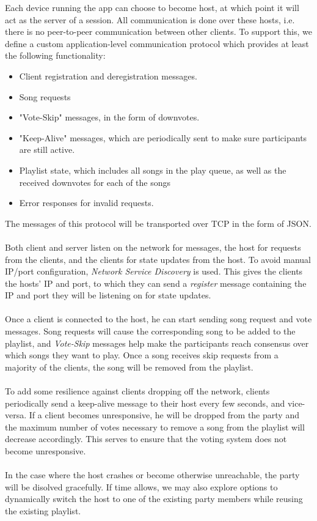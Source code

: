 \documentclass{report}
\begin{document}
Each device running the app can choose to become host, at which point it will
act as the server of a session. All communication is done over these hosts, 
i.e. there is no peer-to-peer communication between other clients.
To support this, we define a custom application-level communication protocol 
which provides at least the following functionality:
\begin{itemize}
\item Client registration and deregistration messages.
\item Song requests
\item "Vote-Skip" messages, in the form of downvotes.
\item "Keep-Alive" messages, which are periodically sent to make sure participants are still active.
\item Playlist state, which includes all songs in the play queue, as well as the received downvotes for each of the songs
\item Error responses for invalid requests.
\end{itemize}
%
The messages of this protocol will be transported over TCP in the form of JSON.\\\\
%
Both client and server listen on the network for messages,
the host for requests from the clients, and the clients for state updates
from the host. To avoid manual IP/port configuration, \emph{Network Service Discovery}
\cite{nsd} is used. This gives the clients the hosts' IP and port,
to which they can send a \emph{register} message containing the IP and port they
will be listening on for state updates. \\\\
%
Once a client is connected to the host, he can start sending song request and vote messages.
Song requests will cause the corresponding song to be added to the playlist, and \emph{Vote-Skip}
messages help make the participants reach consensus over which songs they want to play. 
Once a song receives skip requests
from a majority of the clients, the song will be removed from the playlist.\\\\ 
%
To add some resilience against clients dropping off the network, clients periodically 
send a keep-alive message to their host every few seconds, and vice-versa.
If a client becomes unresponsive, he will be dropped from the party and the maximum number of votes
necessary to remove a song from the playlist will decrease accordingly. This serves to
ensure that the voting system does not become unresponsive.\\\\
%
In the case where the host crashes or become otherwise unreachable, the party will be 
disolved gracefully. If time allows, we may also explore options to dynamically switch 
the host to one of the existing party members while reusing the existing playlist.
%
\end{document}
